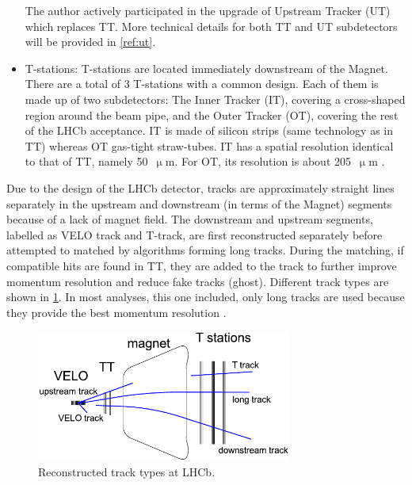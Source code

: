 \begin{itemize}
        The author actively participated in the upgrade of Upstream Tracker (UT)
        which replaces TT.
        More technical details for both TT and UT subdetectors will be provided
        in \cref{ref:ut}.

    \item T-stations:
        T-stations are located immediately downstream of the Magnet.
        There are a total of 3 T-stations with a common design.
        Each of them is made up of two subdetectors: The Inner Tracker (IT),
        covering a cross-shaped region around the beam pipe,
        and the Outer Tracker (OT),
        covering the rest of the LHCb acceptance.
        IT is made of silicon strips (same technology as in TT) whereas OT
        gas-tight straw-tubes.
        IT has a spatial resolution identical to that of TT, namely 50~$\upmu$m.
        For OT, its resolution is about 205~$\upmu$m
        \cite{OT_2014}.
\end{itemize}

Due to the design of the LHCb detector, tracks are approximately straight lines
separately in the upstream and downstream (in terms of the Magnet) segments
because of a lack of magnet field.
The downstream and upstream segments,
labelled as VELO track and T-track,
are first reconstructed separately before attempted to matched by algorithms
forming long tracks.
During the matching,
if compatible hits are found in TT, they are added to the track to further
improve momentum resolution and reduce fake tracks (ghost).
Different track types are shown in \cref{fig:track-types}.
In most analyses, this one included, only long tracks are used because they
provide the best momentum resolution
\cite{LHCb-DP-2013-002}.

\begin{figure}[!htb]
    \centering
    \includegraphics[width=0.75\textwidth]{./figs-detector/tracking/track_type.pdf}
    \caption{
        Reconstructed track types at LHCb.
    }
    \label{fig:track-types}
\end{figure}


